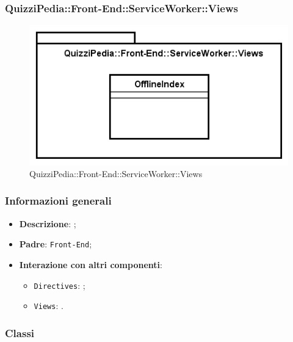 \newpage
\subsubsection[QuizziPedia::Front-End::ServiceWorker::Views]{QuizziPedia::Front-End::ServiceWorker::Views}
\begin{figure} [ht]
	\centering
	\includegraphics[scale=0.80]{UML/Package/QuizziPedia_Front-End_ServiceWorker_Views.png}
	\caption{QuizziPedia::Front-End::ServiceWorker::Views}
\end{figure} \FloatBarrier

\subsubsection{Informazioni generali}
\begin{itemize}
	\item \textbf{Descrizione}:	;
	\item \textbf{Padre}: \texttt{Front-End};
	\item \textbf{Interazione con altri componenti}:
	\begin{itemize}
		\item \texttt{Directives}: ;
		\item \texttt{Views}: .
	\end{itemize} 
\end{itemize}
\subsubsection{Classi}



